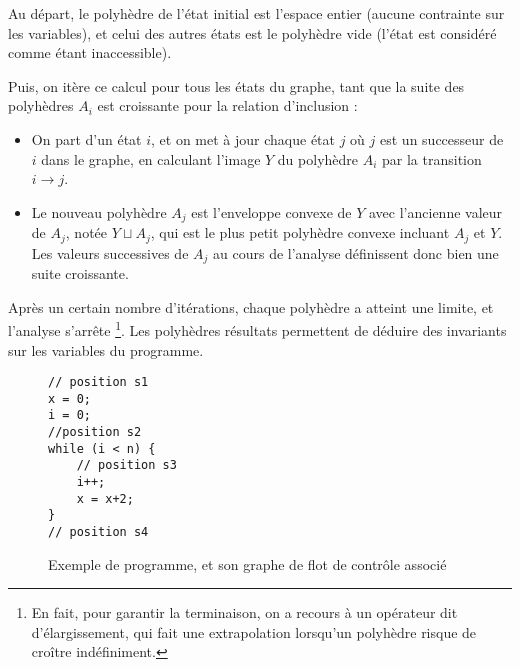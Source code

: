 \documentclass{llncs}
\begin{document}
Au départ, le polyhèdre de l'état initial est l'espace entier (aucune
contrainte sur les variables), et celui des autres états est le polyhèdre vide
(l'état est considéré comme étant inaccessible). 

Puis, on itère ce calcul pour tous les états du graphe, tant que la suite des
polyhèdres $A_i$ est croissante pour la relation d'inclusion :
\begin{itemize}
\item On part d'un état $i$, et on met à jour chaque état $j$ où $j$ est un
successeur de $i$ dans le graphe, en calculant l'image $Y$ du polyhèdre $A_i$
par la transition $i \rightarrow j$. 
\item Le nouveau polyhèdre $A_j$ est
l'enveloppe convexe de $Y$ avec l'ancienne valeur de $A_j$, notée $Y \sqcup
A_j$, qui est le plus petit polyhèdre convexe incluant $A_j$ et $Y$. Les valeurs
successives de $A_j$ au cours de l'analyse définissent donc bien une suite croissante.
\end{itemize}
Après un certain nombre d'itérations, chaque polyhèdre a atteint une limite, et
l'analyse s'arrête \footnote{En fait, pour garantir la terminaison, on a recours
à un opérateur dit d'élargissement, qui fait une extrapolation lorsqu'un
polyhèdre risque de croître indéfiniment.}. Les polyhèdres résultats permettent de déduire des
invariants sur les variables du programme.

\begin{figure}[!h]
\begin{minipage}[b]{0.5\linewidth}
\begin{lstlisting}
// position s1
x = 0;
i = 0;
//position s2
while (i < n) {
	// position s3
	i++;
	x = x+2;
}
// position s4
\end{lstlisting}
\end{minipage}
\begin{minipage}[b]{0.5\linewidth}
\end{minipage}
\caption{Exemple de programme, et son graphe de flot de contrôle associé}
\end{figure}
\end{document}
